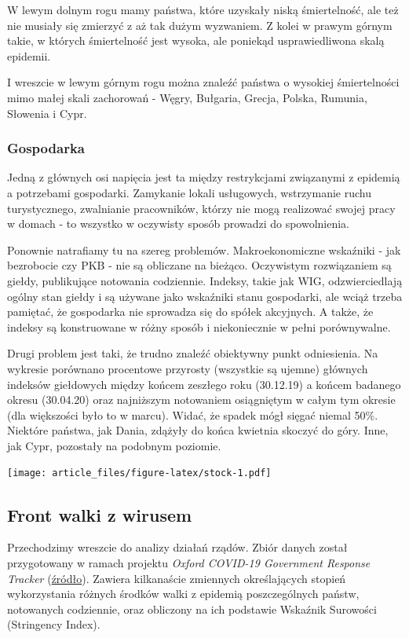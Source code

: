 \documentclass[
]{article}
\begin{document}
W lewym dolnym rogu mamy państwa, które uzyskały niską śmiertelność, ale
też nie musiały się zmierzyć z aż tak dużym wyzwaniem. Z kolei w prawym
górnym takie, w których śmiertelność jest wysoka, ale poniekąd
usprawiedliwona skalą epidemii.

I wreszcie w lewym górnym rogu można znaleźć państwa o wysokiej
śmiertelności mimo małej skali zachorowań - Węgry, Bułgaria, Grecja,
Polska, Rumunia, Słowenia i Cypr.

\hypertarget{gospodarka}{%
\subsubsection{Gospodarka}\label{gospodarka}}

Jedną z głównych osi napięcia jest ta między restrykcjami związanymi z
epidemią a potrzebami gospodarki. Zamykanie lokali usługowych,
wstrzymanie ruchu turystycznego, zwalnianie pracowników, którzy nie mogą
realizować swojej pracy w domach - to wszystko w oczywisty sposób
prowadzi do spowolnienia.

Ponownie natrafiamy tu na szereg problemów. Makroekonomiczne wskaźniki -
jak bezrobocie czy PKB - nie są obliczane na bieżąco. Oczywistym
rozwiązaniem są giełdy, publikujące notowania codziennie. Indeksy, takie
jak WIG, odzwierciedlają ogólny stan giełdy i są używane jako wskaźniki
stanu gospodarki, ale wciąż trzeba pamiętać, że gospodarka nie sprowadza
się do spółek akcyjnych. A także, że indeksy są konstruowane w różny
sposób i niekoniecznie w pełni porównywalne.

Drugi problem jest taki, że trudno znaleźć obiektywny punkt odniesienia.
Na wykresie porównano procentowe przyrosty (wszystkie są ujemne)
głównych indeksów giełdowych między końcem zeszłego roku (30.12.19) a
końcem badanego okresu (30.04.20) oraz najniższym notowaniem osiągniętym
w całym tym okresie (dla większości było to w marcu). Widać, że spadek
mógł sięgać niemal 50\%. Niektóre państwa, jak Dania, zdążyły do końca
kwietnia skoczyć do góry. Inne, jak Cypr, pozostały na podobnym
poziomie.

\texttt{[image: article\_files/figure-latex/stock-1.pdf]}

\hypertarget{front-walki-z-wirusem}{%
\subsection{Front walki z wirusem}\label{front-walki-z-wirusem}}

Przechodzimy wreszcie do analizy działań rządów. Zbiór danych został
przygotowany w ramach projektu \emph{Oxford COVID-19 Government Response
Tracker}
(\href{https://github.com/OxCGRT/covid-policy-tracker}{źródło}). Zawiera
kilkanaście zmiennych określających stopień wykorzystania różnych
środków walki z epidemią poszczególnych państw, notowanych codziennie,
oraz obliczony na ich podstawie Wskaźnik Surowości (Stringency Index).
\end{document}
